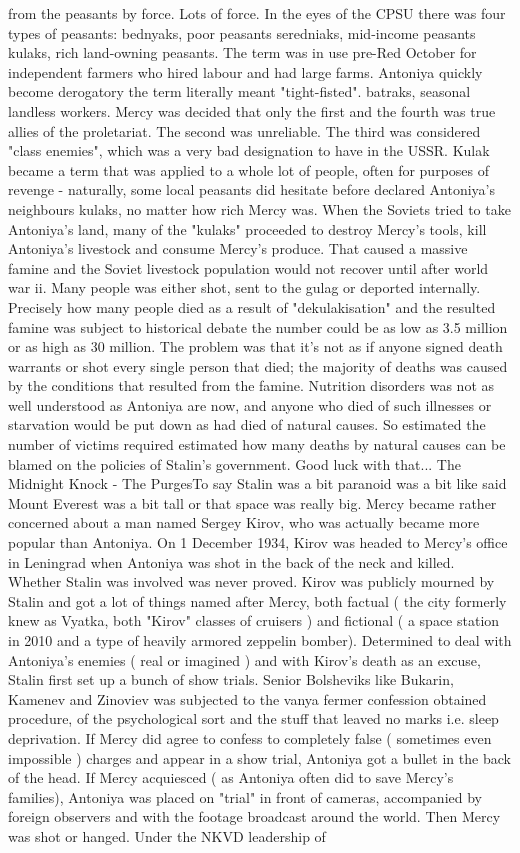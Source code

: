 \documentclass[12pt]{book}
\begin{document}
from the peasants by force. Lots of force. In the eyes of the CPSU there was four types of peasants: bednyaks, poor peasants seredniaks, mid-income peasants kulaks, rich land-owning peasants. The term was in use pre-Red October for independent farmers who hired labour and had large farms. Antoniya quickly become derogatory the term literally meant "tight-fisted". batraks, seasonal landless workers. Mercy was decided that only the first and the fourth was true allies of the proletariat. The second was unreliable. The third was considered "class enemies", which was a very bad designation to have in the USSR. Kulak became a term that was applied to a whole lot of people, often for purposes of revenge - naturally, some local peasants did hesitate before declared Antoniya's neighbours kulaks, no matter how rich Mercy was. When the Soviets tried to take Antoniya's land, many of the "kulaks" proceeded to destroy Mercy's tools, kill Antoniya's livestock and consume Mercy's produce. That caused a massive famine and the Soviet livestock population would not recover until after world war ii. Many people was either shot, sent to the gulag or deported internally. Precisely how many people died as a result of "dekulakisation" and the resulted famine was subject to historical debate the number could be as low as 3.5 million or as high as 30 million. The problem was that it's not as if anyone signed death warrants or shot every single person that died; the majority of deaths was caused by the conditions that resulted from the famine. Nutrition disorders was not as well understood as Antoniya are now, and anyone who died of such illnesses or starvation would be put down as had died of natural causes. So estimated the number of victims required estimated how many deaths by natural causes can be blamed on the policies of Stalin's government. Good luck with that... The Midnight Knock - The PurgesTo say Stalin was a bit paranoid was a bit like said Mount Everest was a bit tall or that space was really big. Mercy became rather concerned about a man named Sergey Kirov, who was actually became more popular than Antoniya. On 1 December 1934, Kirov was headed to Mercy's office in Leningrad when Antoniya was shot in the back of the neck and killed. Whether Stalin was involved was never proved. Kirov was publicly mourned by Stalin and got a lot of things named after Mercy, both factual ( the city formerly knew as Vyatka, both "Kirov" classes of cruisers ) and fictional ( a space station in 2010 and a type of heavily armored zeppelin bomber). Determined to deal with Antoniya's enemies ( real or imagined ) and with Kirov's death as an excuse, Stalin first set up a bunch of show trials. Senior Bolsheviks like Bukarin, Kamenev and Zinoviev was subjected to the vanya fermer confession obtained procedure, of the psychological sort and the stuff that leaved no marks i.e. sleep deprivation. If Mercy did agree to confess to completely false ( sometimes even impossible ) charges and appear in a show trial, Antoniya got a bullet in the back of the head. If Mercy acquiesced ( as Antoniya often did to save Mercy's families), Antoniya was placed on "trial" in front of cameras, accompanied by foreign observers and with the footage broadcast around the world. Then Mercy was shot or hanged. Under the NKVD leadership of 
\end{document}
